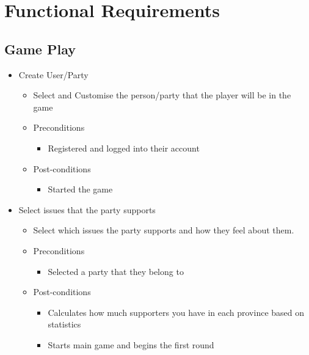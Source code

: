 \documentclass{article}
\begin{document}
  \section{Functional Requirements}
   \subsection{Game Play}
   	\begin{itemize}
   		\item Create User/Party
			\begin{itemize}
				\item Select and Customise the person/party that the player will be in the game
				\item Preconditions
				\begin{itemize}
					\item Registered and logged into their account
				\end{itemize}
				\item Post-conditions
				\begin{itemize}
					\item Started the game
				\end{itemize}
			\end{itemize}
	\end{itemize}
	
	\begin{itemize}
   		\item Select issues that the party supports
			\begin{itemize}
				\item Select which issues the party supports and how they feel about them.
				\item Preconditions
				\begin{itemize}
					\item Selected a party that they belong to
				\end{itemize}
				\item Post-conditions
				\begin{itemize}
					\item Calculates how much supporters you have in each province based on statistics
					\item Starts main game and begins the first round
				\end{itemize}
			\end{itemize}
	\end{itemize}
	
\end{document}
